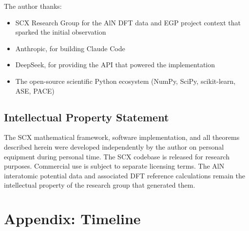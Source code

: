 \documentclass[12pt,a4paper]{ctexart}
\begin{document}
The author thanks:
\begin{itemize}
\item SCX Research Group for the AlN DFT data and EGP project context that sparked the initial observation

\item Anthropic, for building Claude Code
\item DeepSeek, for providing the API that powered the implementation
\item The open-source scientific Python ecosystem (NumPy, SciPy, scikit-learn, ASE, PACE)
\end{itemize}

\subsection*{Intellectual Property Statement}

The SCX mathematical framework, software implementation, and all theorems described herein were developed independently by the author on personal equipment during personal time. The SCX codebase is released for research purposes. Commercial use is subject to separate licensing terms. The AlN interatomic potential data and associated DFT reference calculations remain the intellectual property of the research group that generated them.

\section*{Appendix: Timeline}
\end{document}
